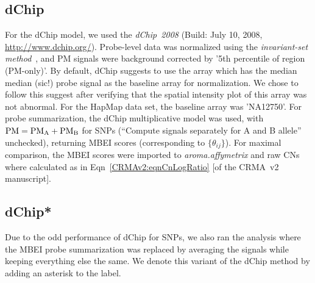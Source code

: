 \documentclass[10pt,a4paper]{article}
\newcommand{\PMA}{\ensuremath{\textnormal{PM}_\textnormal{A}}\xspace}
\newcommand{\PMB}{\ensuremath{\textnormal{PM}_\textnormal{B}}\xspace}
\newcommand{\pkg}[1]{\textit{#1}\xspace}
\newcommand{\PM}{\textnormal{PM}\xspace}
\begin{document}


\subsection{dChip}
For the dChip model, we used the \pkg{dChip~2008} (Build: July 10, 2008, \url{http://www.dchip.org/}).  Probe-level data was normalized using the \emph{invariant-set method}~\citep{LiWong_2001}, and PM signals were background corrected by '5th percentile of region (PM-only)'.  
By default, dChip suggests to use the array which has the median median (sic!) probe signal as the baseline array for normalization.  We chose to follow this suggest after verifying that the spatial intensity plot of this array was not abnormal. For the HapMap data set, the baseline array was 'NA12750'.
For probe summarization, the dChip multiplicative model was used, with $\PM=\PMA+\PMB$ for SNPs (``Compute signals separately for A and B allele'' unchecked), returning MBEI scores (corresponding to $\{\theta_{ij}\}$).  For maximal comparison, the MBEI scores were imported to \pkg{aroma.affymetrix} and raw CNs where calculated as in Eqn~\eqref{CRMAv2:eqnCnLogRatio} [of the CRMA~v2 manuscript].


\subsection{dChip*}
Due to the odd performance of dChip for SNPs, we also ran the analysis where the MBEI probe summarization was replaced by averaging the signals while keeping everything else the same.  We denote this variant of the dChip method by adding an asterisk to the label.
\end{document}
